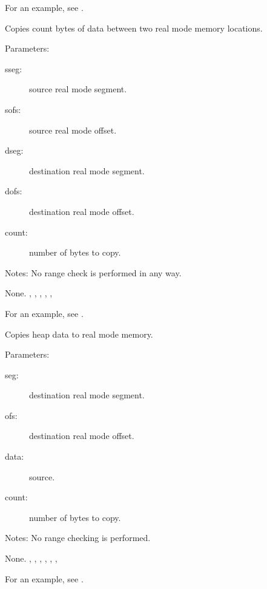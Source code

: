 For an example, see .

{Copies count bytes of data between two \dos real mode memory locations.

Parameters:
\begin{description}
\item[sseg:\ ] source real mode segment. 
\item[sofs:\ ] source real mode offset.
\item[dseg:\ ] destination real mode segment. 
\item[dofs:\ ] destination real mode offset.
\item[count:\ ] number of bytes to copy.
\end{description}

Notes: No range check is performed in any way.
}
{ None.}
{, 
,
, 
, 
,
 }

For an example, see .

{Copies heap data to \dos real mode memory.

Parameters:
\begin{description}
\item[seg:\ ] destination real mode segment.
\item[ofs:\ ] destination real mode offset. 
\item[data:\ ] source. 
\item[count:\ ] number of bytes to copy.
\end{description}

Notes: No range checking is performed.
}{ None. }
{, 
,
,
,
,
,
 }

For an example, see .




